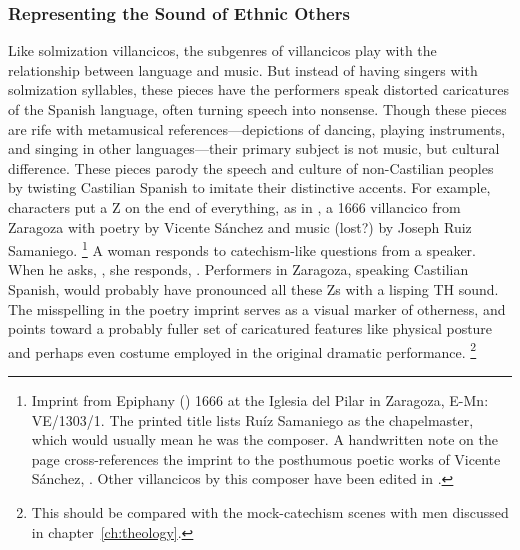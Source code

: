 \subsubsection{Representing the Sound of Ethnic Others}

Like solmization villancicos, the subgenres of  villancicos play with the relationship between language and music. 
But instead of having singers  with solmization syllables, these pieces have the performers speak distorted caricatures of the Spanish language, often turning speech into nonsense.
Though these pieces are rife with metamusical references---depictions of dancing, playing instruments, and singing in other languages---their primary subject is not music, but cultural difference.
These pieces parody the speech and culture of non-Castilian peoples by twisting Castilian Spanish to imitate their distinctive accents. 
For example,   characters put a Z on the end of everything, as in , a 1666 villancico from Zaragoza with poetry by Vicente Sánchez and music (lost?) by Joseph Ruiz Samaniego.%
	\footnote{%
	Imprint from Epiphany () 1666 at the Iglesia del Pilar in Zaragoza, E-Mn: VE/1303/1.
	The printed title lists Ruíz Samaniego as the chapelmaster, which would usually mean he was the composer. 
	A handwritten note on the page cross-references the imprint to the posthumous poetic works of Vicente Sánchez, .
	Other villancicos by this composer have been edited in \autocite{RuizSamaniego:MME63}.
	}
A  woman responds to catechism-like questions from a  speaker.
When he asks, , she responds, .
Performers in Zaragoza, speaking Castilian Spanish, would probably have pronounced all these Zs with a lisping TH sound.
The misspelling in the poetry imprint serves as a visual marker of otherness, and points toward a probably fuller set of caricatured features like physical posture and perhaps even costume employed in the original dramatic performance.%
	\footnote{%
	This should be compared with the mock-catechism scenes with  men discussed in chapter~\ref{ch:theology}.
	}

